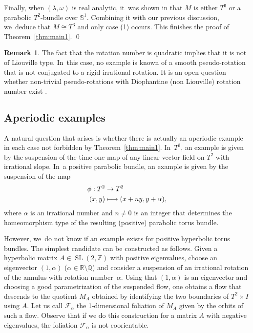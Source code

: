 \documentclass[JEP,XML,SOM,Unicode,NoEqCountersInSection,NoFloatCountersInSection,published]{cedram}
\newcommand\mto{\mathchoice{\longmapsto}{\mapsto}{\mapsto}{\mapsto}}
\theoremstyle{definition}
\newtheorem{Remark}[theorem]{Remark}
\newcommand{\mS}{\mathbb{S}}
\begin{document}
Finally, when $(\lambda,\omega)$ is real analytic, it~was shown in \cite[\S 4]{Re} that $M$ is either $T^3$ or a parabolic $T^2$-bundle over $\mS^1$. Combining it with our previous discussion, we~deduce that $M\cong T^3$ and only case (1) occurs. This finishes the proof of Theorem~\ref{thm:main1}.
\hfill \qed

\begin{Remark}\label{rem: pseudo-rotation}
The fact that the rotation number is quadratic implies that it is not of Liouville type. In~this case, no example is known of a smooth pseudo-rotation that is not conjugated to a rigid irrational rotation. It is an open question whether non-trivial pseudo-rotations with Diophantine (\ie non Liouville) rotation number exist \cite{FK}.
\end{Remark}

\subsection{Aperiodic examples}
A natural question that arises is whether there is actually an aperiodic example in each case not forbidden by Theorem~\ref{thm:main1}. In~$T^3$, an example is given by the suspension of the time one map of any linear vector field on $T^2$ with irrational slope. In~a positive parabolic bundle, an example is given by the suspension of the map
\begin{align*}
\phi: T^2 &\to T^2\\
	 (x,y) &\mto (x+ny,y+\alpha),
\end{align*}
where $\alpha$ is an irrational number and $n\neq 0$ is an integer that determines the homeomorphism type of the resulting (positive) parabolic torus bundle.

However, we~do not know if an example exists for positive hyperbolic torus bundles. The simplest candidate can be constructed as follows. Given a hyperbolic matrix $A\in \operatorname{SL}(2,\mathbb{Z})$ with positive eigenvalues, choose an eigenvector $(1,\alpha)$
($\alpha \in \mathbb{R}\setminus \mathbb{Q}$) and consider a suspension of an irrational rotation of the annulus with rotation number~$\alpha$. Using that $(1,\alpha)$ is an eigenvector and choosing a good parametrization of the suspended flow, one obtains a flow that descends to the quotient $M_A$ obtained by identifying the two boundaries of $T^2\times I$ using $A$. Let us call $\mathcal{F}_\alpha$ the 1-dimensional foliation of $M_A$ given by the orbits of such a flow. Observe that if we do this construction for a matrix $A$ with negative eigenvalues, the foliation $\mathcal{F}_\alpha$ is not coorientable.
\end{document}
